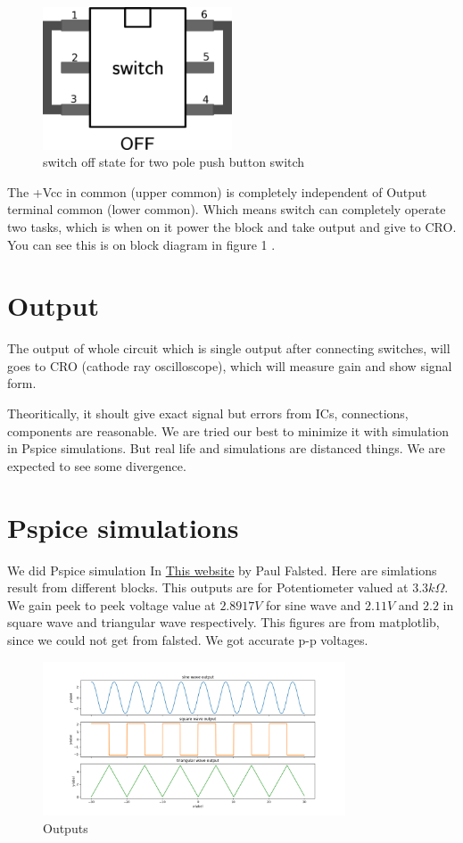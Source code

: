 \documentclass{article}
\begin{document}
\begin{figure}[H]
    \centering
    \label{switchoff}
    \includegraphics[width=0.5\textwidth]{imgs/switchoff.png}
    \caption{switch off state for two pole push button switch}
\end{figure}

The +Vcc in common (upper common) is completely independent of Output terminal common (lower common). Which means switch can completely operate two tasks, which is when on it power the block and take output and give to CRO. You can see this is on block diagram in figure 1 \label{orgd565ec9}.



\section{Output}
\label{sec:org88635c1}

The output of whole circuit which is single output after connecting switches, will goes to CRO (cathode ray oscilloscope), which will measure gain and show signal form.

Theoritically, it shoult give exact signal but errors from ICs, connections, components are reasonable. We are tried our best to minimize it with simulation in Pspice simulations. But real life and simulations are distanced things. We are expected to see some divergence.

\section{Pspice simulations}
\label{sec:org615f60d}

We did Pspice simulation In \href{https://www.falstad.com/circuit/}{This website} by Paul Falsted. Here are simlations result from different blocks. This outputs are for Potentiometer valued at \(3.3k\Omega\). We gain peek to peek voltage value at \(2.8917V\) for sine wave and \(2.11V\) and \(2.2\) in square wave and triangular wave respectively. This figures are from matplotlib, since we could not get from falsted. We got accurate p-p voltages.

\begin{figure}[H]
    \centering
    \label{outputs}
    \includegraphics[width=0.8\textwidth]{imgs/outputs.png}
    \caption{Outputs}
\end{figure}




\end{document}
